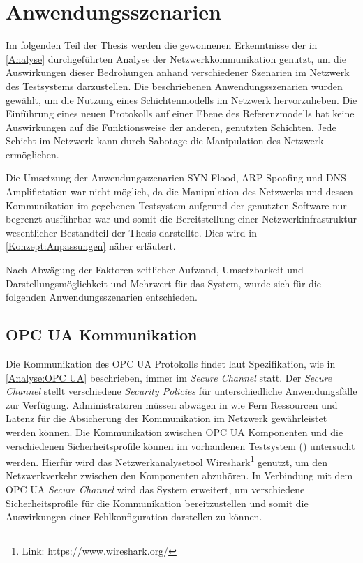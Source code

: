 \chapter{Anwendungsszenarien}
\label{Anwendungsszenarien}
Im folgenden Teil der Thesis werden die gewonnenen Erkenntnisse der in \autoref{Analyse} durchgeführten Analyse der Netzwerkkommunikation genutzt, um die Auswirkungen dieser Bedrohungen anhand verschiedener Szenarien im Netzwerk des Testsystems darzustellen. Die beschriebenen Anwendungsszenarien wurden gewählt, um die Nutzung eines Schichtenmodells im Netzwerk hervorzuheben. Die Einführung eines neuen Protokolls auf einer Ebene des Referenzmodells hat keine Auswirkungen auf die Funktionsweise der anderen, genutzten Schichten. Jede Schicht im Netzwerk kann durch Sabotage die Manipulation des Netzwerk ermöglichen.

Die Umsetzung der Anwendungsszenarien SYN-Flood, \ac{ARP} Spoofing und \ac{DNS} Amplifictation war nicht möglich, da die Manipulation des Netzwerks und dessen Kommunikation im gegebenen Testsystem aufgrund der genutzten Software nur begrenzt ausführbar war und somit die Bereitstellung einer Netzwerkinfrastruktur wesentlicher Bestandteil der Thesis darstellte. Dies wird in \autoref{Konzept:Anpassungen} näher erläutert.

Nach Abwägung der Faktoren zeitlicher Aufwand, Umsetzbarkeit und Darstellungsmöglichkeit und Mehrwert für das System, wurde sich für die folgenden Anwendungsszenarien entschieden.

\section{\ac{OPC UA} Kommunikation}
\label{Anwendungsszenarien:OPC UA Kommunikation}
Die Kommunikation des \ac{OPC UA} Protokolls findet laut Spezifikation, wie in \autoref{Analyse:OPC UA} beschrieben, immer im \textit{Secure Channel} statt. Der \textit{Secure Channel} stellt verschiedene \textit{Security Policies} für unterschiedliche Anwendungsfälle zur Verfügung. Administratoren müssen abwägen in wie Fern Ressourcen und Latenz für die Absicherung der Kommunikation im Netzwerk gewährleistet werden können. Die Kommunikation zwischen \ac{OPC UA} Komponenten und die verschiedenen Sicherheitsprofile können im vorhandenen Testsystem (\cite{Weber2018}) untersucht werden. Hierfür wird das Netzwerkanalysetool Wireshark\footnote{Link: https://www.wireshark.org/} genutzt, um den Netzwerkverkehr zwischen den Komponenten abzuhören. In Verbindung mit dem \ac{OPC UA} \textit{Secure Channel} wird das System erweitert, um verschiedene Sicherheitsprofile für die Kommunikation bereitzustellen und somit die Auswirkungen einer Fehlkonfiguration darstellen zu können.

